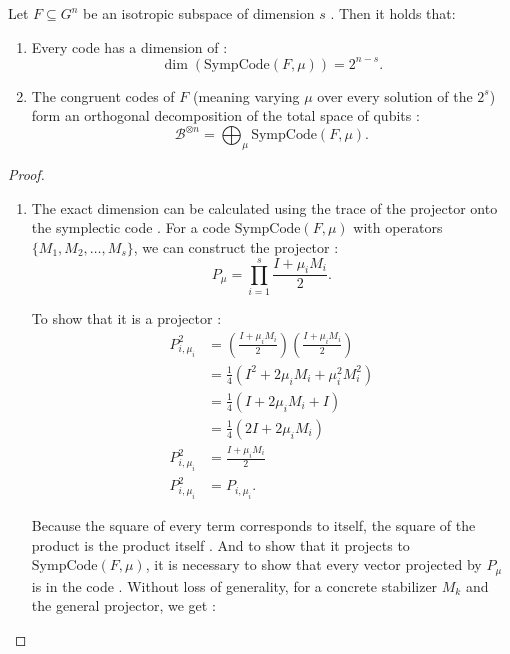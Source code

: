 \begin{theorem}
  Let $F \subseteq G^n$ be an isotropic subspace of dimension $s$ \citep{Kitaev2002}. Then it holds that:
  \begin{enumerate}
    \item Every code has a dimension of \citep{Kitaev2002}:
      \begin{equation}
        \dim(\text{SympCode}(F, \mu)) = 2^{n - s}
        \label{eq:decomp_1}
      .\end{equation}
    \item The congruent codes of $F$ (meaning varying $\mu$ over every solution of the $2^s$) form an orthogonal decomposition of the total space of qubits \citep{Kitaev2002}:
      \begin{equation}
        \mathcal{B}^{\otimes n} = \bigoplus_{\mu} \text{SympCode}(F, \mu)
        \label{eq:decomp_2}
      .\end{equation}
  \end{enumerate}

  \begin{proof}
  \begin{enumerate}
    \item The exact dimension can be calculated using the trace of the projector onto the symplectic code \citep{Kitaev2002}. For a code $\text{SympCode}(F, \mu)$ with operators $\{M_1, M_2, \ldots, M_s\}$, we can construct the projector \citep{Kitaev2002}:
      \begin{equation}
        P_\mu = \prod_{i = 1}^s \frac{I + \mu_i M_i}{2}
        \label{eq:proy_simpl}
      .\end{equation}

      To show that it is a projector \citep{Cesar2024}:
      \begin{align*}
        P^2_{i, \mu_i} &= \left(\frac{I + \mu_i M_i}{2}\right)\left(\frac{I + \mu_i M_i}{2}\right)\\
        &= \frac{1}{4} \left(I^2 + 2\mu_i M_i + \mu_i^2 M_i^2\right)\\
        &= \frac{1}{4} \left(I + 2\mu_i M_i + I\right)\\
        &= \frac{1}{4} \left(2I + 2\mu_i M_i\right)\\
        P^2_{i,\mu_i} &= \frac{I + \mu_i M_i}{2}\\
        P^2_{i,\mu_i} &= P_{i,\mu_i}
      .\end{align*}

      Because the square of every term corresponds to itself, the square of the product is the product itself \citep{Cesar2024}. And to show that it projects to $\text{SympCode}(F, \mu)$, it is necessary to show that every vector projected by $P_\mu$ is in the code \citep{Cesar2024}. Without loss of generality, for a concrete stabilizer $M_k$ and the general projector, we get \citep{Cesar2024}:


\end{enumerate}
\end{proof}
\end{theorem}
